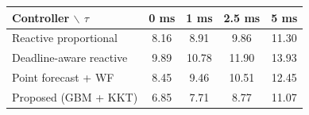 \begin{tabular}{lcccc}
\hline
Controller $\backslash$ $\tau$ & 0 ms & 1 ms & 2.5 ms & 5 ms \\
\hline
Reactive proportional & 8.16 & 8.91 & 9.86 & 11.30 \\
Deadline-aware reactive & 9.89 & 10.78 & 11.90 & 13.93 \\
Point forecast + WF & 8.45 & 9.46 & 10.51 & 12.45 \\
Proposed (GBM + KKT) & 6.85 & 7.71 & 8.77 & 11.07 \\
\hline
\end{tabular}
